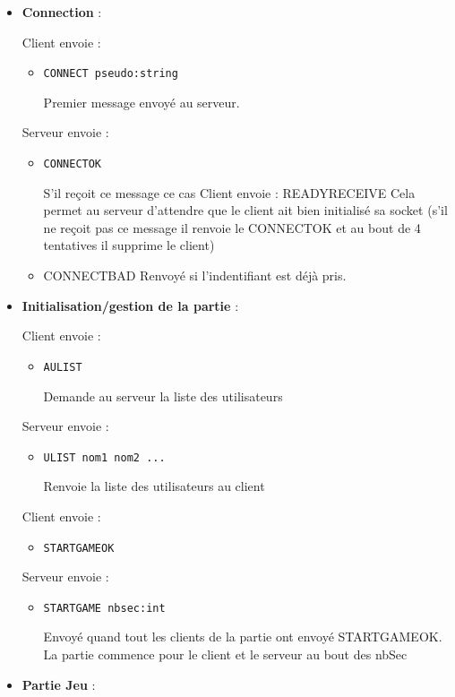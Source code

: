\begin{itemize}
\item{\textbf{Connection} :}

Client envoie :
\begin{itemize}
\item{\begin{verbatim}CONNECT pseudo:string\end{verbatim}
Premier message envoyé au serveur.}
\end{itemize}
Serveur envoie :
\begin{itemize}
\item{\begin{verbatim}CONNECTOK\end{verbatim}
S'il reçoit ce message ce cas Client envoie :
READYRECEIVE Cela permet au serveur d'attendre que le client ait bien initialisé sa socket (s'il ne reçoit pas ce message il renvoie le CONNECTOK et au bout de 4 tentatives il supprime le client)}
\item{CONNECTBAD
Renvoyé si l'indentifiant est déjà pris.}
\end{itemize}

\item{\textbf{Initialisation/gestion de la partie} :}

Client envoie :
\begin{itemize}
\item{\begin{verbatim}AULIST\end{verbatim}
Demande au serveur la liste des utilisateurs}
\end{itemize}
Serveur envoie :
\begin{itemize}
\item{\begin{verbatim}ULIST nom1 nom2 ...\end{verbatim}}
Renvoie la liste des utilisateurs au client
\end{itemize}
Client envoie :
\begin{itemize}
\item{\begin{verbatim}STARTGAMEOK\end{verbatim}}
\end{itemize}
Serveur envoie :
\begin{itemize}
\item{\begin{verbatim}STARTGAME nbsec:int\end{verbatim}
Envoyé quand tout les clients de la partie ont envoyé STARTGAMEOK. La partie commence pour le client et le serveur au bout des nbSec}
\end{itemize}
\item{\textbf{Partie Jeu} :}


\end{itemize}
